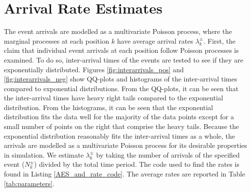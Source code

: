 \section{Arrival Rate Estimates}\label{ch:poisson}
The event arrivals are modelled as a multivariate Poisson process, where the marginal processes at each position $k$ have average arrival rates $\lambda^{\pm}_k$. First, the claim that individual event arrivals at each position follow Poisson processes is examined. To do so, inter-arrival times of the events are tested to see if they are exponentially distributed. Figures \ref{fig:interarrivals_pos} and \ref{fig:interarrivals_neg} show QQ-plots and histograms of the inter-arrival times compared to exponential distributions. From the QQ-plots, it can be seen that the inter-arrival times have heavy right tails compared to the exponential distribution. From the histograms, it can be seen that the exponential distribution fits the data well for the majority of the data points except for a small number of points on the right that comprise the heavy tails. Because the exponential distribution reasonably fits the inter-arrival times as a whole, the arrivals are modelled as a multivariate Poisson process for its desirable properties in simulation. We estimate $\lambda^{\pm}_k$ by taking the number of arrivals of the specified event ($N^{\pm}_k$) divided by the total time period. The code used to find the rates is found in Listing \ref{AES_and_rate_code}. The average rates are reported in Table \ref{tab:parameters}.

